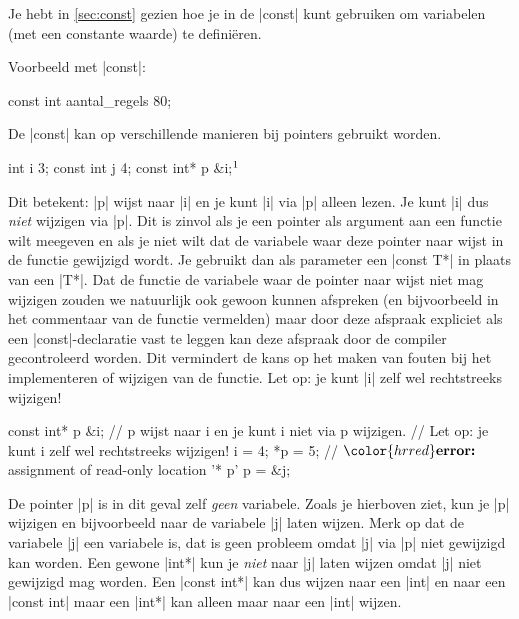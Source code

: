 \begin{cpplstShortInline}

\label{sec:constpointers}
Je hebt in \cref{sec:const} gezien hoe je in \Cpp{} de |const|  kunt gebruiken om  variabelen (met een constante waarde) te definiëren.

Voorbeeld met |const|:
\begin{cpplstfragment}
const int aantal_regels {80};
\end{cpplstfragment}

De  |const| kan op verschillende manieren bij pointers gebruikt worden.

\begin{cpplstfragment}[mathescape=true]
int i {3};
const int j {4};
const int* p {&i};$\footnotemark$
\end{cpplstfragment}


Dit betekent: |p| wijst naar |i| en je kunt |i| via |p| alleen lezen. Je kunt |i| dus \emph{niet} wijzigen via |p|. 
Dit is zinvol als je een pointer als argument aan een functie wilt meegeven en als je niet wilt dat de variabele waar deze pointer naar wijst in de functie gewijzigd wordt.
Je gebruikt dan als parameter een |const T*| in plaats van een |T*|.
Dat de functie de variabele waar de pointer naar wijst niet mag wijzigen zouden we natuurlijk ook gewoon kunnen afspreken (en bijvoorbeeld in het commentaar van de functie vermelden) maar door deze afspraak expliciet als een |const|-declaratie vast te leggen kan deze afspraak door de compiler gecontroleerd worden.
Dit vermindert de kans op het maken van fouten bij het implementeren of wijzigen van de functie.
Let op: je kunt |i| zelf wel rechtstreeks wijzigen!

\begin{cpplstfragment}[mathescape=true]
    const int* p {&i};
    // p wijst naar i en je kunt i niet via p wijzigen. 
    // Let op: je kunt i zelf wel rechtstreeks wijzigen!
    i = 4;
    *p = 5;
//  $\color{hrred}\textbf{error:}$ assignment of read-only location '* p'
    p = &j;
\end{cpplstfragment}

De pointer |p| is in dit geval zelf \emph{geen}  variabele. Zoals je hierboven ziet, kun je |p| wijzigen en bijvoorbeeld naar de variabele |j| laten wijzen. Merk op dat de variabele |j| een  variabele is, dat is geen probleem omdat |j| via |p| niet gewijzigd kan worden. Een gewone |int*| kun je \emph{niet} naar |j| laten wijzen omdat |j| niet gewijzigd mag worden. Een |const int*| kan dus wijzen naar een |int| en naar een |const int| maar een |int*| kan alleen maar naar een |int| wijzen.


\end{cpplstShortInline}
